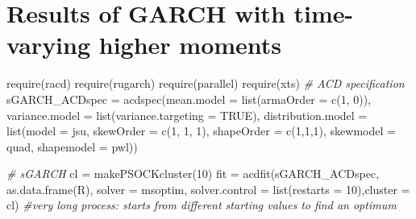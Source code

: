 \documentclass[a4paper, twoside]{templates/ociamthesis}
\newenvironment{Shaded}{\begin{snugshade}}{\end{snugshade}}
\newcommand{\AttributeTok}[1]{\textcolor[rgb]{0.77,0.63,0.00}{#1}}
\newcommand{\CommentTok}[1]{\textcolor[rgb]{0.56,0.35,0.01}{\textit{#1}}}
\newcommand{\ConstantTok}[1]{\textcolor[rgb]{0.00,0.00,0.00}{#1}}
\newcommand{\DecValTok}[1]{\textcolor[rgb]{0.00,0.00,0.81}{#1}}
\newcommand{\FunctionTok}[1]{\textcolor[rgb]{0.00,0.00,0.00}{#1}}
\newcommand{\NormalTok}[1]{#1}
\newcommand{\OtherTok}[1]{\textcolor[rgb]{0.56,0.35,0.01}{#1}}
\newcommand{\StringTok}[1]{\textcolor[rgb]{0.31,0.60,0.02}{#1}}
\renewenvironment{Shaded}
{
  \vspace{10pt}%
  \begin{snugshade}%
}{%
  \end{snugshade}%
  \vspace{8pt}%
}
\begin{document}
\hypertarget{results-of-garch-with-time-varying-higher-moments}{%
\section{Results of GARCH with time-varying higher moments}\label{results-of-garch-with-time-varying-higher-moments}}

\begin{Shaded}
\begin{Highlighting}[]
\FunctionTok{require}\NormalTok{(racd)}
\FunctionTok{require}\NormalTok{(rugarch)}
\FunctionTok{require}\NormalTok{(parallel)}
\FunctionTok{require}\NormalTok{(xts)}
\CommentTok{\# ACD specification}
\NormalTok{sGARCH\_ACDspec }\OtherTok{=} \FunctionTok{acdspec}\NormalTok{(}\AttributeTok{mean.model =} \FunctionTok{list}\NormalTok{(}\AttributeTok{armaOrder =} \FunctionTok{c}\NormalTok{(}\DecValTok{1}\NormalTok{, }\DecValTok{0}\NormalTok{)), }\AttributeTok{variance.model =} \FunctionTok{list}\NormalTok{(}\AttributeTok{variance.targeting =} \ConstantTok{TRUE}\NormalTok{),}
\AttributeTok{distribution.model =} \FunctionTok{list}\NormalTok{(}\AttributeTok{model =} \StringTok{\textquotesingle{}jsu\textquotesingle{}}\NormalTok{, }\AttributeTok{skewOrder =} \FunctionTok{c}\NormalTok{(}\DecValTok{1}\NormalTok{, }\DecValTok{1}\NormalTok{, }\DecValTok{1}\NormalTok{), }\AttributeTok{shapeOrder =} \FunctionTok{c}\NormalTok{(}\DecValTok{1}\NormalTok{,}\DecValTok{1}\NormalTok{,}\DecValTok{1}\NormalTok{), }\AttributeTok{skewmodel =} \StringTok{\textquotesingle{}quad\textquotesingle{}}\NormalTok{, }\AttributeTok{shapemodel =} \StringTok{\textquotesingle{}pwl\textquotesingle{}}\NormalTok{))}

\CommentTok{\# sGARCH}
\NormalTok{cl }\OtherTok{=} \FunctionTok{makePSOCKcluster}\NormalTok{(}\DecValTok{10}\NormalTok{)}
\NormalTok{fit }\OtherTok{=} \FunctionTok{acdfit}\NormalTok{(sGARCH\_ACDspec, }\FunctionTok{as.data.frame}\NormalTok{(R), }\AttributeTok{solver =} \StringTok{\textquotesingle{}msoptim\textquotesingle{}}\NormalTok{, }\AttributeTok{solver.control =} \FunctionTok{list}\NormalTok{(}\AttributeTok{restarts =} \DecValTok{10}\NormalTok{),}\AttributeTok{cluster =}\NormalTok{ cl) }\CommentTok{\#very long process: starts from different starting values to find an optimum}
\end{Highlighting}
\end{Shaded}
\end{document}
